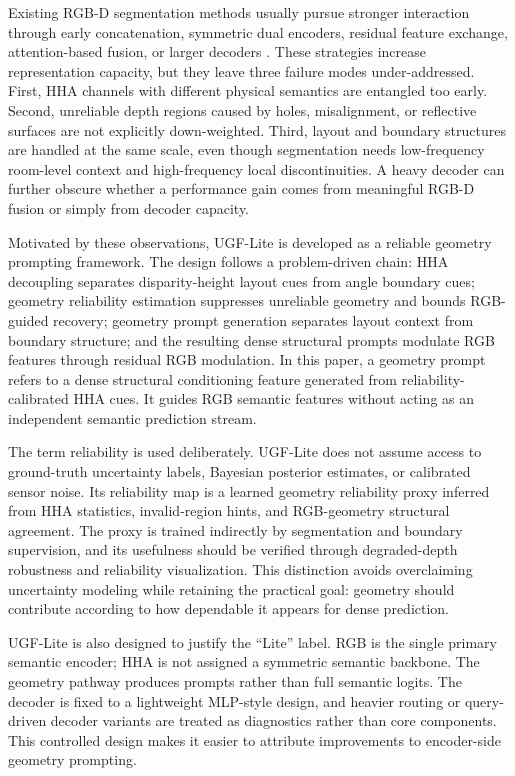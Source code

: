 \documentclass[a4paper,fleqn]{cas-dc}
\begin{document}
Existing RGB-D segmentation methods usually pursue stronger interaction through early concatenation, symmetric dual encoders, residual feature exchange, attention-based fusion, or larger decoders \citep{hazirbas2016fusenet,long2015fcn}. These strategies increase representation capacity, but they leave three failure modes under-addressed. First, HHA channels with different physical semantics are entangled too early. Second, unreliable depth regions caused by holes, misalignment, or reflective surfaces are not explicitly down-weighted. Third, layout and boundary structures are handled at the same scale, even though segmentation needs low-frequency room-level context and high-frequency local discontinuities. A heavy decoder can further obscure whether a performance gain comes from meaningful RGB-D fusion or simply from decoder capacity.

Motivated by these observations, UGF-Lite is developed as a reliable geometry prompting framework. The design follows a problem-driven chain: HHA decoupling separates disparity-height layout cues from angle boundary cues; geometry reliability estimation suppresses unreliable geometry and bounds RGB-guided recovery; geometry prompt generation separates layout context from boundary structure; and the resulting dense structural prompts modulate RGB features through residual RGB modulation. In this paper, a geometry prompt refers to a dense structural conditioning feature generated from reliability-calibrated HHA cues. It guides RGB semantic features without acting as an independent semantic prediction stream.

The term reliability is used deliberately. UGF-Lite does not assume access to ground-truth uncertainty labels, Bayesian posterior estimates, or calibrated sensor noise. Its reliability map is a learned geometry reliability proxy inferred from HHA statistics, invalid-region hints, and RGB-geometry structural agreement. The proxy is trained indirectly by segmentation and boundary supervision, and its usefulness should be verified through degraded-depth robustness and reliability visualization. This distinction avoids overclaiming uncertainty modeling while retaining the practical goal: geometry should contribute according to how dependable it appears for dense prediction.

UGF-Lite is also designed to justify the ``Lite'' label. RGB is the single primary semantic encoder; HHA is not assigned a symmetric semantic backbone. The geometry pathway produces prompts rather than full semantic logits. The decoder is fixed to a lightweight MLP-style design, and heavier routing or query-driven decoder variants are treated as diagnostics rather than core components. This controlled design makes it easier to attribute improvements to encoder-side geometry prompting.
\end{document}
